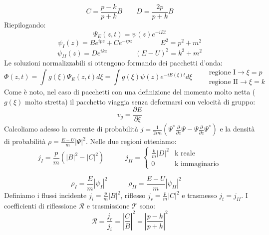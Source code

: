 \begin{equation*}
C=\frac{p-k}{p+k}B \qquad D=\frac{2p}{p+k}B
\end{equation*}
Riepilogando:
\begin{equation*}
    \Psi_E(z,t) = \psi(z) e^{-iEt}
\end{equation*}
\begin{equation*}
    \psi_I(z) = Be^{ip z} + Ce^{-ip z} \qquad \qquad E^2 = p^2 + m^2
\end{equation*}
\begin{equation*}
    \psi_{II}(z) = D e^{ik z} \qquad \qquad (E - U)^2 = k^2 + m^2
\end{equation*}
Le soluzioni normalizzabili si ottengono formando dei pacchetti d'onda:
\begin{equation*}
        \Phi(z,t) = \int g(\xi) \Psi_E(z,t) d\xi = \int g(\xi) \psi(z) e^{-iE(\xi)t} d\xi
        \qquad
        \begin{array}{l}
            \text{regione I} \to \xi = p \\
            \text{regione II} \to \xi = k
        \end{array}
\end{equation*}
Come è noto, nel caso di pacchetti con una definizione del momento molto netta ($g(\xi)$ molto stretta) il pacchetto viaggia senza deformarsi con velocità di gruppo:
\begin{equation*}
    v_g=\frac{\partial E}{\partial \xi}
\end{equation*}
Calcoliamo adesso la corrente di probabilità $j=\frac{1}{2im}(\Psi^{*}\frac{\partial}{\partial z}\Psi-\Psi\frac{\partial}{\partial z}\Psi^{*})$ e la densità di probabilità $\rho=\frac{E-U}{m}|\Psi|^{2}$. Nelle due regioni otteniamo:
\begin{equation*}
j_{I}=\frac{p}{m}(|B|^{2}-|C|^{2}) \quad \text{} \qquad j_{II}= \begin{cases} \frac{k}{m}|D|^{2} & \text{k reale} \\ 0 & \text{k immaginario} \end{cases}
\end{equation*}

\begin{equation*}
\rho_{I}=\frac{E}{m}|\psi_{I}|^{2} \quad \text{} \qquad \rho_{II}=\frac{E-U}{m}|\psi_{II}|^{2} \quad \text{}
\end{equation*}
Definiamo i flussi incidente $j_i=\frac{p}{m}|B|^{2}$, riflesso $j_r=\frac{p}{m}|C|^{2}$ e trasmesso $j_t=j_{II}$. I coefficienti di riflessione $\mathcal{R}$ e trasmissione $\mathcal{T}$ sono:
\begin{equation*}
\mathcal{R}=\frac{j_{r}}{j_{i}}=\left|\frac{C}{B}\right|^{2}=\left|\frac{p-k}{p+k}\right|^{2}
\end{equation*}

